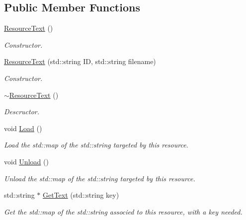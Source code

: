 \subsection*{Public Member Functions}
\begin{DoxyCompactItemize}
\item 
\mbox{\hyperlink{classsfmlbe_1_1_resource_text_aaf976bc4d8e514a621239ab3ef61b294}{Resource\+Text}} ()
\begin{DoxyCompactList}\small\item\em Constructor. \end{DoxyCompactList}\item 
\mbox{\hyperlink{classsfmlbe_1_1_resource_text_a05e07dcbb416cee62e4060627a76c749}{Resource\+Text}} (std\+::string ID, std\+::string filename)
\begin{DoxyCompactList}\small\item\em Constructor. \end{DoxyCompactList}\item 
\mbox{\hyperlink{classsfmlbe_1_1_resource_text_a037b1bd5ac566301358ee5cd75a4cd00}{$\sim$\+Resource\+Text}} ()
\begin{DoxyCompactList}\small\item\em Descructor. \end{DoxyCompactList}\item 
void \mbox{\hyperlink{classsfmlbe_1_1_resource_text_a1176965f3e9d26c618688f7899b4b58b}{Load}} ()
\begin{DoxyCompactList}\small\item\em Load the std\+::map of the std\+::string targeted by this resource. \end{DoxyCompactList}\item 
void \mbox{\hyperlink{classsfmlbe_1_1_resource_text_a7493d044dfcd376b0fd17fd5fbd52ada}{Unload}} ()
\begin{DoxyCompactList}\small\item\em Unload the std\+::map of the std\+::string targeted by this resource. \end{DoxyCompactList}\item 
std\+::string $\ast$ \mbox{\hyperlink{classsfmlbe_1_1_resource_text_a36954e8d61e7406f4923fda6acd4e4f3}{Get\+Text}} (std\+::string key)
\begin{DoxyCompactList}\small\item\em Get the std\+::map of the std\+::string associed to this resource, with a key needed. \end{DoxyCompactList}\end{DoxyCompactItemize}
